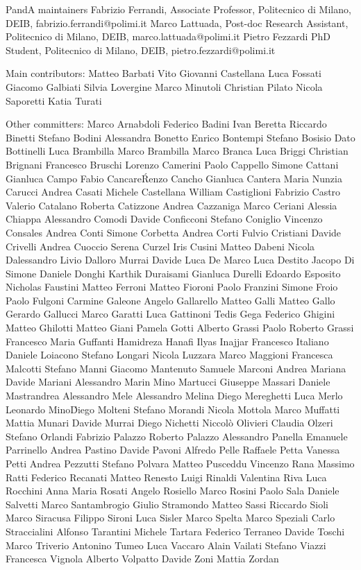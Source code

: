 
\begin{DoxyVerbInclude}
PandA maintainers
Fabrizio Ferrandi, Associate Professor, Politecnico di Milano, DEIB, fabrizio.ferrandi@polimi.it
Marco Lattuada, Post-doc Research Assistant, Politecnico di Milano, DEIB, marco.lattuada@polimi.it
Pietro Fezzardi PhD Student, Politecnico di Milano, DEIB, pietro.fezzardi@polimi.it

Main contributors:
Matteo Barbati
Vito Giovanni Castellana
Luca Fossati
Giacomo Galbiati
Silvia Lovergine
Marco Minutoli
Christian Pilato
Nicola Saporetti
Katia Turati

Other committers:
Marco Arnabdoli
Federico Badini
Ivan Beretta
Riccardo Binetti
Stefano Bodini
Alessandra Bonetto
Enrico Bontempi
Stefano Bosisio
Dato Bottinelli
Luca Brambilla
Marco Brambilla   
Marco Branca
Luca Briggi
Christian Brignani   
Francesco Bruschi
Lorenzo Camerini
Paolo Cappello
Simone Cattani
Gianluca Campo
Fabio Cancare\'
Renzo Cancho
Gianluca Cantera
Maria Nunzia Carucci
Andrea Casati
Michele Castellana
William Castiglioni
Fabrizio Castro
Valerio Catalano
Roberta Catizzone
Andrea Cazzaniga
Marco Ceriani
Alessia Chiappa
Alessandro Comodi
Davide Conficconi
Stefano Coniglio
Vincenzo Consales
Andrea Conti
Simone Corbetta
Andrea Corti
Fulvio Cristiani
Davide Crivelli
Andrea Cuoccio
Serena Curzel
Iris Cusini
Matteo Dabeni
Nicola Dalessandro
Livio Dalloro
Murrai Davide
Luca De Marco
Luca Destito
Jacopo Di Simone
Daniele Donghi
Karthik Duraisami
Gianluca Durelli
Edoardo Esposito
Nicholas Faustini
Matteo Ferroni
Matteo Fioroni
Paolo Franzini
Simone Froio
Paolo Fulgoni
Carmine Galeone
Angelo Gallarello
Matteo Galli
Matteo Gallo
Gerardo Gallucci
Marco Garatti
Luca Gattinoni
Tedis Gega
Federico Ghigini
Matteo Ghilotti
Matteo Giani
Pamela Gotti   
Alberto Grassi   
Paolo Roberto Grassi
Francesco Maria Guffanti
Hamidreza Hanafi
Ilyas Inajjar
Francesco Italiano
Daniele Loiacono
Stefano Longari
Nicola Luzzara
Marco Maggioni
Francesca Malcotti
Stefano Manni
Giacomo Mantenuto
Samuele Marconi
Andrea Mariana
Davide Mariani
Alessandro Marin
Mino Martucci
Giuseppe Massari
Daniele Mastrandrea
Alessandro Mele
Alessandro Melina
Diego Mereghetti
Luca Merlo
Leonardo Mino\'
Diego Molteni
Stefano Morandi
Nicola Mottola
Marco Muffatti
Mattia Munari
Davide Murrai
Diego Nichetti
Niccolò Olivieri
Claudia Olzeri
Stefano Orlandi
Fabrizio Palazzo
Roberto Palazzo
Alessandro Panella
Emanuele Parrinello
Andrea Pastino
Davide Pavoni
Alfredo Pelle
Raffaele Petta
Vanessa Petti
Andrea Pezzutti
Stefano Polvara
Matteo Pusceddu
Vincenzo Rana
Massimo Ratti
Federico Recanati
Matteo Renesto
Luigi Rinaldi
Valentina Riva
Luca Rocchini
Anna Maria Rosati
Angelo Rosiello
Marco Rosini
Paolo Sala
Daniele Salvetti
Marco Santambrogio
Giulio Stramondo
Matteo Sassi
Riccardo Sioli
Marco Siracusa
Filippo Sironi
Luca Sisler
Marco Spelta
Marco Speziali
Carlo Straccialini
Alfonso Tarantini
Michele Tartara
Federico Terraneo
Davide Toschi
Marco Triverio
Antonino Tumeo
Luca Vaccaro
Alain Vailati
Stefano Viazzi
Francesca Vignola
Alberto Volpatto
Davide Zoni
Mattia Zordan

\end{DoxyVerbInclude}
 